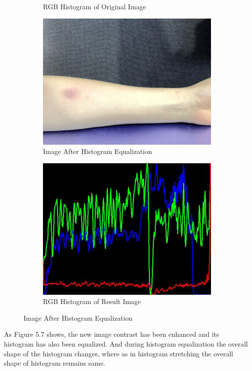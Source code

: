 \begin{figure}[!h]
\begin{subfigure}{.5\textwidth}
  \caption{RGB Histogram of Original Image}
  \label{fig:sub1}
\end{subfigure}
\begin{subfigure}{.5\textwidth}
  \centering
  \includegraphics[scale=0.23]{img/equalize}
  \caption{Image After Histogram Equalization}
  \label{fig:sub2}
\end{subfigure}%
\begin{subfigure}{.5\textwidth}
  \centering
  \includegraphics[scale=0.43]{img/equalimage}
  \caption{RGB Histogram of Result Image}
  \label{fig:sub1}
\end{subfigure}
\label{fig:test}
\caption{Image After Histogram Equalization}
\end{figure}
As Figure 5.7 shows, the new image contrast has been enhanced and its histogram has also been equalized. And during histogram equalization the overall shape of the histogram changes, where as in histogram stretching the overall shape of histogram remains same.

